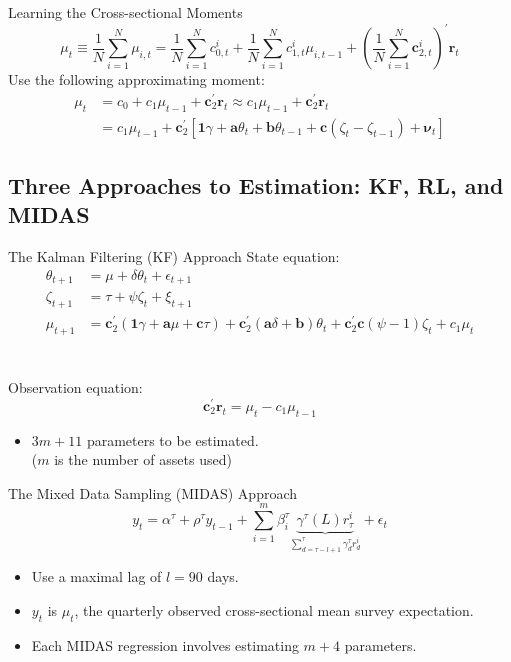 \documentclass[UTF8, 16pt]{beamer}
\begin{document}
\begin{CJK*}{UTF8}{gbsn}
\begin{frame}{Learning the Cross-sectional Moments}
	$$
	\mu_{t} \equiv \frac{1}{N} \sum_{i=1}^{N} \mu_{i, t}=\frac{1}{N} \sum_{i=1}^{N} c_{0, t}^{i}+\frac{1}{N} \sum_{i=1}^{N} c_{1, t}^{i} \mu_{i, t-1}+\left(\frac{1}{N} \sum_{i=1}^{N} \mathbf{c}_{2, t}^{i}\right)^{\prime} \mathbf{r}_{t}
	$$
	Use the following approximating moment:
	$$
	\begin{aligned}
		\mu_{t}&=c_{0}+c_{1} \mu_{t-1}+\mathbf{c}_{2}^{\prime} \mathbf{r}_{t} \approx c_{1} \mu_{t-1}+\mathbf{c}_{2}^{\prime} \mathbf{r}_{t}
		\\
		& =c_{1} \mu_{t-1}+\mathbf{c}_{2}^{\prime}\left[\mathbf{1} \gamma+\mathbf{a} \theta_{t}+\mathbf{b} \theta_{t-1}+\mathbf{c}\left(\zeta_{t}-\zeta_{t-1}\right)+\boldsymbol{\nu}_{t}\right]
	\end{aligned}
	$$
\end{frame}

\subsection{Three Approaches to Estimation: KF, RL, and MIDAS}
\begin{frame}{The Kalman Filtering (KF) Approach}
	State equation:
	$$
	\begin{aligned} \theta_{t+1} & =\mu+\delta \theta_{t}+\epsilon_{t+1} \\ \zeta_{t+1} & =\tau+\psi \zeta_{t}+\xi_{t+1} \\ \mu_{t+1} & =\mathbf{c}_{2}^{\prime}(\mathbf{1} \gamma+\mathbf{a} \mu+\mathbf{c} \tau)+\mathbf{c}_{2}^{\prime}(\mathbf{a} \delta+\mathbf{b}) \theta_{t}+\mathbf{c}_{2}^{\prime} \mathbf{c}(\psi-1) \zeta_{t}+c_{1} \mu_{t}\end{aligned}
	$$
	\\ \ \\
	Observation equation:
	$$
	\mathbf{c}_{2}^{\prime} \mathbf{r}_{t}=\mu_{t}-c_{1} \mu_{t-1}
	$$
	\begin{itemize}
		\item $3m + 11$ parameters to be estimated. \\ ($m$ is the number of assets used)
	\end{itemize}
\end{frame}
\begin{frame}{The Mixed Data Sampling (MIDAS) Approach}
	$$y_{t}=\alpha^{\tau}+\rho^{\tau} y_{t-1}+\sum_{i=1}^{m} {\beta_{i}^{\tau} \underbrace{\gamma^{\tau}(L) r_{\tau}^{i}}_{\sum_{d=\tau-l+1}^{\tau}{\gamma_{d}^{\tau} r_{d}^{i}}}}+\epsilon_{t}$$
	\begin{itemize}
		\item Use a maximal lag of $l = 90$ days.
		\item $y_t$ is $\mu_t$, the quarterly observed cross-sectional mean survey expectation.
		\item Each MIDAS regression involves estimating $m+4$ parameters.
	\end{itemize}
	

\end{frame}
\end{CJK*}
\end{document}
